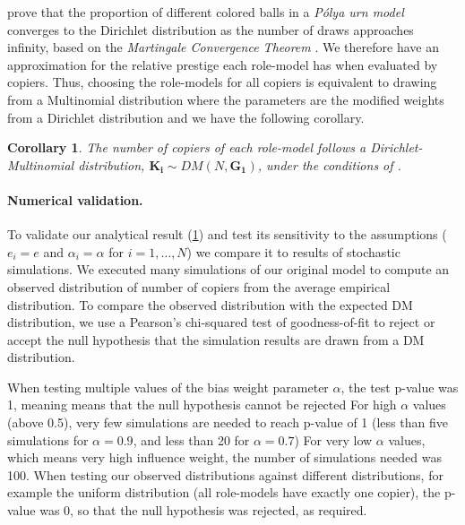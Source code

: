 \documentclass[12pt]{extarticle}
\let\vec\mathbf
\newtheorem{corollary}{Corollary}
\begin{document}
\citet[section 2]{dirichlet} prove that the proportion of different colored balls in a \textit{P\'{o}lya urn model} converges to the Dirichlet distribution as the number of draws approaches infinity, based on the \textit{Martingale Convergence Theorem} \citep{martingaleBook}.
We therefore have an approximation for the relative prestige each role-model has when evaluated by copiers. Thus, choosing the role-models for all copiers is equivalent to drawing from a Multinomial distribution where the parameters are the modified weights from a Dirichlet distribution and we have the following corollary.
\\

\begin{corollary}\label{cor:dirichlet}
The number of copiers of each role-model follows a Dirichlet-Multinomial distribution, $\vec{K_i} \sim \textit{DM}(N,\vec{G_1})$, under the conditions of .
\end{corollary}

\paragraph{Numerical validation.}
To validate our analytical result (\cref{cor:dirichlet}) and test its sensitivity to the assumptions ($e_i=e$ and $\alpha_i=\alpha$ for $i=1,\ldots,N$) we compare it to results of stochastic simulations.
We executed many simulations of our original model to  %
compute an observed distribution of number of copiers from the average empirical distribution. To compare the observed distribution with the expected DM distribution, we use a Pearson's chi-squared test of goodness-of-fit to reject or accept the null hypothesis that the simulation results are drawn from a DM distribution.

When testing multiple values of the bias weight parameter $\alpha$, the test p-value was 1, meaning means that the null hypothesis cannot be rejected
For high $\alpha$ values (above 0.5), very few simulations are needed to reach p-value of 1 (less than five simulations for $\alpha=0.9$, and less than 20 for $\alpha=0.7$)
For very low $\alpha$ values, which means very high influence weight, the number of simulations needed was 100.
When testing our observed distributions against different distributions, for example the uniform distribution (all role-models have exactly one copier), the p-value was 0, so that the null hypothesis was rejected, as required. %
\end{document}
